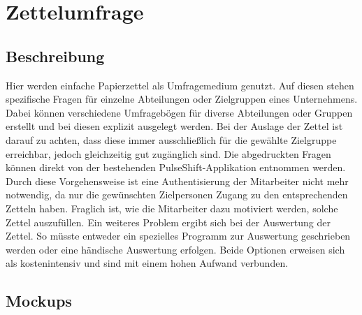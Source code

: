 \section{Zettelumfrage}

\subsection{Beschreibung}
Hier werden einfache Papierzettel als Umfragemedium genutzt. Auf diesen stehen spezifische Fragen für einzelne Abteilungen oder Zielgruppen eines Unternehmens. Dabei können verschiedene Umfragebögen für diverse Abteilungen oder Gruppen erstellt und bei diesen explizit ausgelegt werden. Bei der Auslage der Zettel ist darauf zu achten, dass diese immer ausschließlich für die gewählte Zielgruppe erreichbar, jedoch gleichzeitig gut zugänglich sind. Die abgedruckten Fragen können direkt von der bestehenden PulseShift-Applikation entnommen werden. Durch diese Vorgehensweise ist eine Authentisierung der Mitarbeiter nicht mehr notwendig, da nur die gewünschten Zielpersonen Zugang zu den entsprechenden Zetteln haben. Fraglich ist, wie die Mitarbeiter dazu motiviert werden, solche Zettel auszufüllen. Ein weiteres Problem ergibt sich bei der Auswertung der Zettel. So müsste entweder ein spezielles Programm zur Auswertung geschrieben werden oder eine händische Auswertung erfolgen. Beide Optionen erweisen sich als kostenintensiv und sind mit einem hohen Aufwand verbunden.

\subsection{Mockups}

